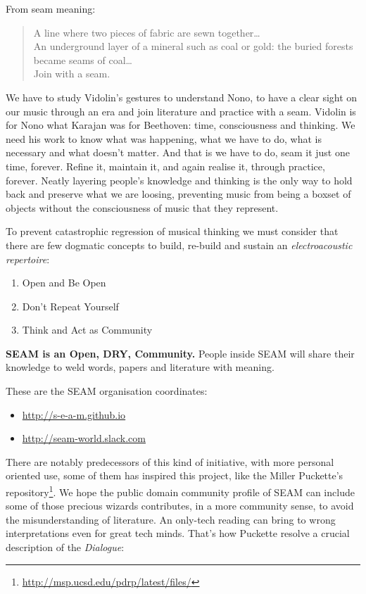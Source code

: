 \documentclass[twoside,a4paper]{article}
\begin{document}
From seam meaning:

\begin{quote}
\begin{it}
A line where two pieces of fabric are sewn together\ldots \\
An underground layer of a mineral such as coal or gold: the buried forests
became seams of coal\ldots\\
Join with a seam.
\end{it}
\end{quote}

We have to study Vidolin's gestures to understand Nono, to have a clear sight on
our music through an era and join literature and practice with a seam. Vidolin is
for Nono what Karajan was for Beethoven: time, consciousness and thinking. We
need his work to know what was happening, what we have to do, what is necessary
and what doesn't matter. And that is we have to do, seam it just one time,
forever. Refine it, maintain it, and again realise it, through practice, forever.
Neatly layering people's knowledge and thinking is the only way to hold back and
preserve what we are loosing, preventing music from being a boxset of objects
without the consciousness of music that they represent.

To prevent catastrophic regression of musical thinking we must consider that
there are few dogmatic concepts to build, re-build and sustain an
\emph{electroacoustic repertoire}:

\begin{enumerate}
  \item Open and Be Open
  \item Don't Repeat Yourself
  \item Think and Act as Community
\end{enumerate}

\textbf{SEAM is an Open, DRY, Community.} People inside SEAM will share their
knowledge to weld words, papers and literature with meaning.

These are the SEAM organisation coordinates:
\begin{itemize}
\item \url{http://s-e-a-m.github.io}
\item \url{http://seam-world.slack.com}
\end{itemize}

There are notably predecessors of this kind of initiative, with more personal
oriented use, some of them has inspired this project, like the Miller Puckette's
repository\footnote{\url{http://msp.ucsd.edu/pdrp/latest/files/}}. We hope the
public domain community profile of SEAM can include some of those precious
wizards contributes, in a more community sense, to avoid the misunderstanding
of literature. An only-tech reading can bring to wrong interpretations even for
great tech minds. That's how Puckette \cite{mp01} resolve a crucial description
of the \emph{Dialogue}:
\end{document}
